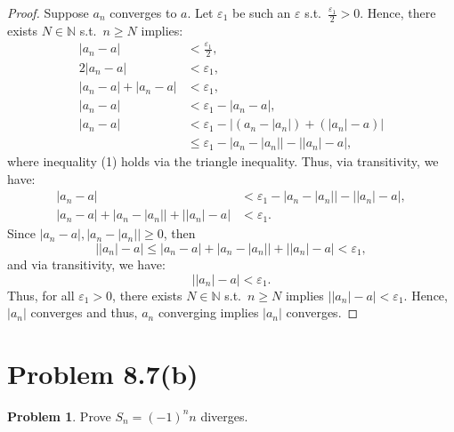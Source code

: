 \documentclass{article}
\theoremstyle{definition}
\newtheorem*{problem}{Problem}
\begin{document}
\begin{proof}
Suppose $a_n$ converges to $a$. Let $\varepsilon_1$ be such an $\varepsilon$ s.t.\ $\frac{\varepsilon_1}{2} > 0$. Hence, there exists $N \in \mathbb{N}$ s.t.\ $n \geq N$ implies:
\begin{align*}
|a_n - a| &< \frac{\varepsilon_1}{2}, \\
2|a_n - a| &< \varepsilon_1, \\
|a_n - a| + |a_n - a| &< \varepsilon_1, \\
|a_n - a| &< \varepsilon_1 - |a_n - a|, \\
|a_n - a| &< \varepsilon_1 - \bigl|(a_n - |a_n|) + (|a_n| - a)\bigr| \\
&\leq \varepsilon_1 - \bigl|a_n - |a_n|\bigr| - \bigl||a_n| - a\bigr|, \tag{1}
\end{align*}
where inequality (1) holds via the triangle inequality. Thus, via transitivity, we have:
\begin{align*}
|a_n - a| &< \varepsilon_1 - \bigl|a_n - |a_n|\bigr| - \bigl||a_n| - a\bigr|, \\
|a_n - a| + \bigl|a_n - |a_n|\bigr| + \bigl||a_n| - a\bigr| &< \varepsilon_1.
\end{align*}
Since $|a_n - a|, \bigl|a_n - |a_n|\bigr| \geq 0$, then
\[
\bigl||a_n| - a\bigr| \leq |a_n - a| + \bigl|a_n - |a_n|\bigr| + \bigl||a_n| - a\bigr| < \varepsilon_1,
\]
and via transitivity, we have:
\[
\bigl||a_n| - a\bigr| < \varepsilon_1.
\]
Thus, for all $\varepsilon_1 > 0$, there exists $N \in \mathbb{N}$ s.t.\ $n \geq N$ implies $\bigl||a_n| - a\bigr| < \varepsilon_1$. Hence, $|a_n|$ converges and thus, $a_n$ converging implies $|a_n|$ converges.
\end{proof}


\clearpage
\section{Problem 8.7(b)}

\begin{problem}
Prove $S_n = (-1)^n n$ diverges.
\end{problem}
\end{document}

